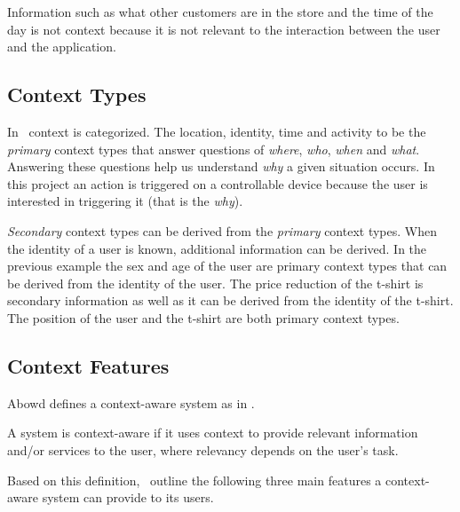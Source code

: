 Information such as what other customers are in the store and the time of the day is not context because it is not relevant to the interaction between the user and the application.

\subsection{Context Types}

In~\cite{abowd1999towards} context is categorized. The location, identity, time and activity to be the \emph{primary} context types that answer questions of \emph{where}, \emph{who}, \emph{when} and \emph{what}. Answering these questions help us understand \emph{why} a given situation occurs. In this project an action is triggered on a controllable device because the user is interested in triggering it (that is the \emph{why}).

\emph{Secondary} context types can be derived from the \emph{primary} context types. When the identity of a user is known, additional information can be derived. In the previous example the sex and age of the user are primary context types that can be derived from the identity of the user. 
The price reduction of the t-shirt is secondary information as well as it can be derived from the identity of the t-shirt.
The position of the user and the t-shirt are both primary context types.

\subsection{Context Features}

Abowd \etal\cite{abowd1999towards} defines a context-aware system as in .

\begin{definition}
\label{def:context-aware}
A system is context-aware if it uses context to provide relevant information and/or services to the user, where relevancy depends on the user's task.
\end{definition}

Based on this definition,~\cite{ferreira2014distributed} outline the following three main features a context-aware system can provide to its users.

